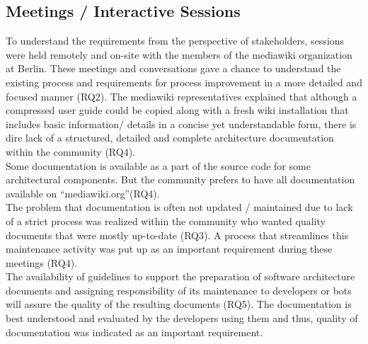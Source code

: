 \subsection{Meetings / Interactive Sessions}
\indent To understand the requirements from the perspective of stakeholders, sessions were held remotely and on-site with the members of the mediawiki organization at Berlin. These meetings and conversations gave a chance to understand the existing process and requirements for process improvement in a more detailed and focused manner (RQ2).
The mediawiki representatives explained that although a compressed user guide could be copied along with a fresh wiki installation that includes basic information/ details in a concise yet understandable form, there is dire lack of a structured, detailed and complete architecture documentation within the community (RQ4). 
\\\indent Some documentation is available as a part of the source code for some architectural components. But the community prefers to have all documentation available on \enquote{mediawiki.org}(RQ4).
\\\indent The problem that documentation is often not updated / maintained due to lack of a strict process was realized within the community who wanted quality documents that were mostly up-to-date (RQ3). A process that streamlines this maintenance activity was put up as an important requirement during these meetings (RQ4). 
\\\indent The availability of guidelines to support the preparation of software architecture documents and assigning responsibility of its maintenance to developers or bots will assure the quality of the resulting documents (RQ5). The documentation is best understood and evaluated by the developers using them and thus, quality of  documentation was indicated as an important requirement.
